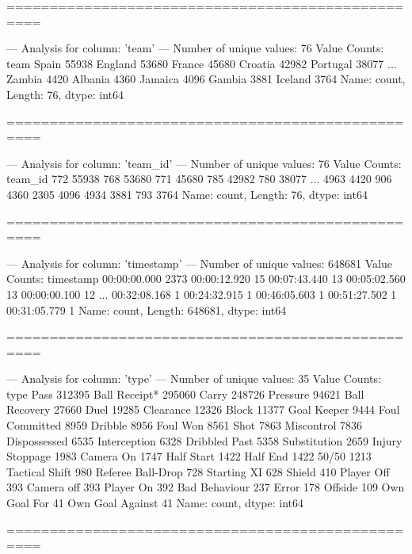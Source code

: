 ==================================================

--- Analysis for column: 'team' ---
Number of unique values: 76
Value Counts:
team
Spain       55938
England     53680
France      45680
Croatia     42982
Portugal    38077
            ...  
Zambia       4420
Albania      4360
Jamaica      4096
Gambia       3881
Iceland      3764
Name: count, Length: 76, dtype: int64

==================================================

--- Analysis for column: 'team_id' ---
Number of unique values: 76
Value Counts:
team_id
772     55938
768     53680
771     45680
785     42982
780     38077
        ...  
4963     4420
906      4360
2305     4096
4934     3881
793      3764
Name: count, Length: 76, dtype: int64

==================================================

--- Analysis for column: 'timestamp' ---
Number of unique values: 648681
Value Counts:
timestamp
00:00:00.000    2373
00:00:12.920      15
00:07:43.440      13
00:05:02.560      13
00:00:00.100      12
                ... 
00:32:08.168       1
00:24:32.915       1
00:46:05.603       1
00:51:27.502       1
00:31:05.779       1
Name: count, Length: 648681, dtype: int64

==================================================

--- Analysis for column: 'type' ---
Number of unique values: 35
Value Counts:
type
Pass                 312395
Ball Receipt*        295060
Carry                248726
Pressure              94621
Ball Recovery         27660
Duel                  19285
Clearance             12326
Block                 11377
Goal Keeper            9444
Foul Committed         8959
Dribble                8956
Foul Won               8561
Shot                   7863
Miscontrol             7836
Dispossessed           6535
Interception           6328
Dribbled Past          5358
Substitution           2659
Injury Stoppage        1983
Camera On              1747
Half Start             1422
Half End               1422
50/50                  1213
Tactical Shift          980
Referee Ball-Drop       728
Starting XI             628
Shield                  410
Player Off              393
Camera off              393
Player On               392
Bad Behaviour           237
Error                   178
Offside                 109
Own Goal For             41
Own Goal Against         41
Name: count, dtype: int64

==================================================

